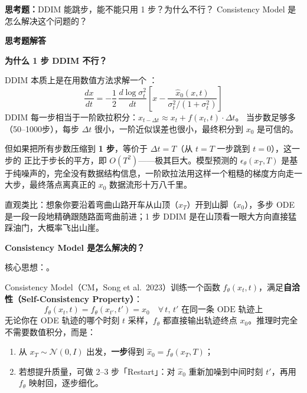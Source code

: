 \begin{warnbox}
\textbf{思考题：}DDIM 能跳步，能不能只用 1 步？为什么不行？
Consistency Model 是怎么解决这个问题的？

\medskip
{}
\end{warnbox}

\begin{conceptbox}
\textbf{思考题解答}

\medskip
\textbf{为什么 1 步 DDIM 不行？}

DDIM 本质上是在用数值方法求解一个 ：
\[
  \frac{dx}{dt} = -\frac{1}{2}\,\frac{d\log\sigma_t^2}{dt}
  \left[x - \frac{\hat{x}_0(x,t)}{\sigma_t^2/(1+\sigma_t^2)}\right]
\]
DDIM 每一步相当于一阶欧拉积分：$x_{t-\Delta t} \approx x_t + f(x_t, t)\cdot\Delta t$。
当步数足够多（50--1000步），每步 $\Delta t$ 很小，一阶近似误差也很小，最终积分到 $x_0$ 是可信的。

但如果把所有步数压缩到 \textbf{1 步}，等价于 $\Delta t = T$（从 $t=T$ 一步跳到 $t=0$），这一步的  正比于步长的平方，即 $O(T^2)$——极其巨大。模型预测的 $\epsilon_\theta(x_T, T)$ 是基于纯噪声的，完全没有数据结构信息，一阶欧拉法用这样一个粗糙的梯度方向走一大步，最终落点离真正的 $x_0$ 数据流形十万八千里。

直观类比：想象你要沿着弯曲山路开车从山顶（$x_T$）开到山脚（$x_0$），多步 ODE 是一段一段地精确跟随路面弯曲前进；1 步 DDIM 是在山顶看一眼大方向直接猛踩油门，大概率飞出山崖。

\medskip
\textbf{Consistency Model 是怎么解决的？}

核心思想：。

Consistency Model（CM，Song et al.\ 2023）训练一个函数 $f_\theta(x_t, t)$，满足\textbf{自洽性（Self-Consistency Property）}：
\[
  f_\theta(x_t, t) = f_\theta(x_{t'}, t') = x_0
  \quad \forall\, t,\, t' \text{ 在同一条 ODE 轨迹上}
\]
无论你在 ODE 轨迹的哪个时刻 $t$ 采样，$f_\theta$ 都直接输出轨迹终点 $x_0$。推理时完全不需要数值积分，而是：

\begin{enumerate}
  \item 从 $x_T \sim \mathcal{N}(0, I)$ 出发，\textbf{一步}得到 $\hat{x}_0 = f_\theta(x_T, T)$；
  \item 若想提升质量，可做 2--3 步「Restart」：对 $\hat{x}_0$ 重新加噪到中间时刻 $t'$，再用 $f_\theta$ 映射回，逐步细化。
\end{enumerate}


\end{conceptbox}
